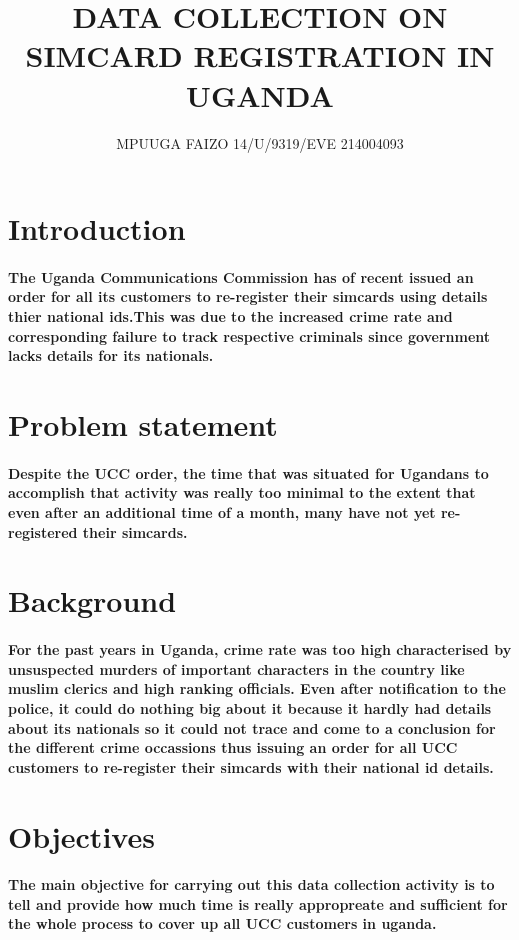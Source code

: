 \documentclass[12pt]{report}
\title{\textbf{DATA COLLECTION ON SIMCARD REGISTRATION IN UGANDA}}
\author{MPUUGA FAIZO 14/U/9319/EVE 214004093}
\begin{document}
\maketitle


\section{Introduction}
\paragraph{The Uganda Communications Commission has of recent issued an order for all its customers to re-register their simcards using details thier national ids.This was due to the increased crime rate and corresponding failure to track respective criminals since government lacks details for its nationals. }


\section{Problem statement}
\paragraph{Despite the UCC order, the time that was situated for Ugandans to accomplish that activity was really too minimal to the extent that even after an additional time of a month, many have not yet re-registered their simcards.}

\section{Background}
\paragraph{For the past years in Uganda, crime rate was too high characterised by unsuspected murders of important characters in the country like muslim clerics and high ranking officials. Even after notification to the police, it could do nothing big about it because it hardly had details about its nationals so it could not trace and come to a conclusion for the different crime occassions thus issuing an order for all UCC customers to re-register their simcards with their national id details.}

\section{Objectives}
\paragraph{The main objective for carrying out this data collection activity is to tell and provide how much time is really appropreate and sufficient for the whole process to cover up all UCC customers in uganda.  }
\end{document}
